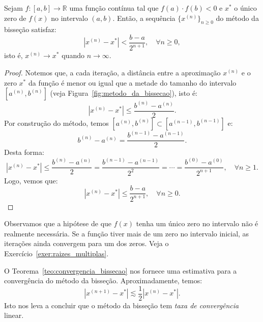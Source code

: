\begin{teo}\label{teo:convergencia_bissecao} Sejam $f:[a, b]\to \mathbb{R}$ uma função contínua tal que $f(a)\cdot f(b) < 0$ e $x^*$ o único zero de $f(x)$ no intervalo $(a, b)$. Então, a sequência $\{x^{(n)}\}_{n \geq 0}$ do método da bisseção satisfaz:
  \begin{equation}
    |x^{(n)} - x^{*}| < \frac{b - a}{2^{n+1}},\quad\forall n\geq 0,
  \end{equation}
isto é, $x^{(n)}\to x^*$ quando $n\to\infty$.
\end{teo}
\begin{proof}
 Notemos que, a cada iteração, a distância entre a aproximação $x^{(n)}$ e o zero $x^*$ da função é menor ou igual que a metade do tamanho do intervalo $[a^{(n)}, b^{(n)}]$ (veja Figura~\ref{fig:metodo_da_bissecao}), isto é:
\begin{equation}
  |x^{(n)}-x^*| \leq \frac{b^{(n)}-a^{(n)}}{2}.
\end{equation}
Por construção do método, temos $[a^{(n)}, b^{(n)}]\subset [a^{(n-1)}, b^{(n-1)}]$ e:
\begin{equation}
  b^{(n)} - a^{(n)} = \frac{b^{(n-1)}-a^{(n-1)}}{2}.
\end{equation}
Desta forma:
\begin{equation}
  |x^{(n)}-x^*|  \leq \frac{b^{(n)}-a^{(n)}}{2} = \frac{b^{(n-1)}-a^{(n-1)}}{2^2} = \cdots = \frac{b^{(0)}-a^{(0)}}{2^{n+1}},\quad \forall n\geq 1.
\end{equation}
Logo, vemos que:
\begin{equation}
  |x^{(n)}-x^*|  \leq \frac{b-a}{2^{n+1}},\quad \forall n\geq 0.
\end{equation}
\end{proof}

Observamos que a hipótese de que $f(x)$ tenha um único zero no intervalo não é realmente necessária. Se a função tiver mais de um zero no intervalo inicial, as iterações ainda convergem para um dos zeros. Veja o Exercício~\ref{exer:raizes_multiplas}.

\begin{obs}
  O Teorema~\ref{teo:convergencia_bissecao} nos fornece uma estimativa para a convergência do método da bisseção. Aproximadamente, temos:
  \begin{equation}
    |x^{(n+1)} - x^*| \lesssim \frac{1}{2}|x^{(n)} - x^*|.
  \end{equation}
Isto nos leva a concluir que o método da bisseção tem \emph{taxa de convergência} linear.
\end{obs}


